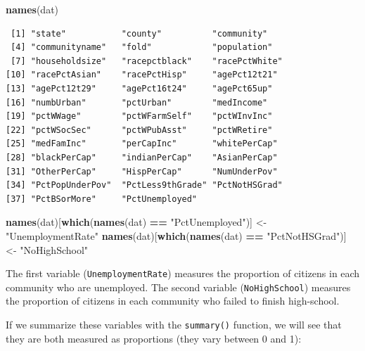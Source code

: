 \documentclass[]{article}
\newenvironment{Shaded}{\begin{snugshade}}{\end{snugshade}}
\newcommand{\KeywordTok}[1]{\textcolor[rgb]{0.13,0.29,0.53}{\textbf{#1}}}
\newcommand{\StringTok}[1]{\textcolor[rgb]{0.31,0.60,0.02}{#1}}
\newcommand{\OperatorTok}[1]{\textcolor[rgb]{0.81,0.36,0.00}{\textbf{#1}}}
\newcommand{\NormalTok}[1]{#1}
\theoremstyle{definition}
\theoremstyle{definition}
\theoremstyle{definition}
\theoremstyle{remark}
\begin{document}
\begin{Shaded}
\begin{Highlighting}[]
\KeywordTok{names}\NormalTok{(dat)}
\end{Highlighting}
\end{Shaded}

\begin{verbatim}
 [1] "state"           "county"          "community"      
 [4] "communityname"   "fold"            "population"     
 [7] "householdsize"   "racepctblack"    "racePctWhite"   
[10] "racePctAsian"    "racePctHisp"     "agePct12t21"    
[13] "agePct12t29"     "agePct16t24"     "agePct65up"     
[16] "numbUrban"       "pctUrban"        "medIncome"      
[19] "pctWWage"        "pctWFarmSelf"    "pctWInvInc"     
[22] "pctWSocSec"      "pctWPubAsst"     "pctWRetire"     
[25] "medFamInc"       "perCapInc"       "whitePerCap"    
[28] "blackPerCap"     "indianPerCap"    "AsianPerCap"    
[31] "OtherPerCap"     "HispPerCap"      "NumUnderPov"    
[34] "PctPopUnderPov"  "PctLess9thGrade" "PctNotHSGrad"   
[37] "PctBSorMore"     "PctUnemployed"  
\end{verbatim}

\begin{Shaded}
\begin{Highlighting}[]
\KeywordTok{names}\NormalTok{(dat)[}\KeywordTok{which}\NormalTok{(}\KeywordTok{names}\NormalTok{(dat) }\OperatorTok{==}\StringTok{ "PctUnemployed"}\NormalTok{)] <-}\StringTok{ "UnemploymentRate"}
\KeywordTok{names}\NormalTok{(dat)[}\KeywordTok{which}\NormalTok{(}\KeywordTok{names}\NormalTok{(dat) }\OperatorTok{==}\StringTok{ "PctNotHSGrad"}\NormalTok{)] <-}\StringTok{ "NoHighSchool"}
\end{Highlighting}
\end{Shaded}

The first variable (\texttt{UnemploymentRate}) measures the proportion
of citizens in each community who are unemployed. The second variable
(\texttt{NoHighSchool}) measures the proportion of citizens in each
community who failed to finish high-school.

If we summarize these variables with the \texttt{summary()} function, we
will see that they are both measured as proportions (they vary between 0
and 1):

\begin{Shaded}
\end{Shaded}
\end{document}
